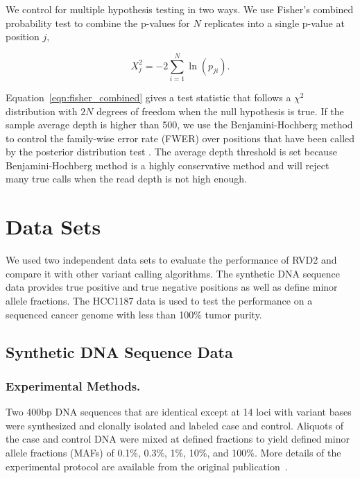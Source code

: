 \documentclass{bioinfo}
\begin{document}
We control for multiple hypothesis testing in two ways. We use Fisher's combined probability test \citep{fisher1970statistical} to combine the p-values for $N$ replicates into a single p-value at position $j$,

\begin{equation}\label{eqn:fisher_combined}
	X_j^2 = -2 \sum_{i=1}^N \ln(p_{ji}).
\end{equation}

Equation~\eqref{eqn:fisher_combined} gives a test statistic that follows a $\chi^2$ distribution with $2N$ degrees of freedom when the null hypothesis is true. If the sample average depth is higher than 500, we use the Benjamini-Hochberg method to control the family-wise error rate (FWER) over positions that have been called by the posterior distribution test \citep{benjamini1995controlling, efron2010large}. The average depth threshold is set because Benjamini-Hochberg method is a highly conservative method and will reject many true calls when the read depth is not high enough.

\section{Data Sets}

We used two independent data sets to evaluate the performance of RVD2 and compare it with other variant calling algorithms. The synthetic DNA sequence data provides true positive and true negative positions as well as define minor allele fractions. The HCC1187 data is used to test the performance on a sequenced cancer genome with less than 100\% tumor purity.

\subsection{Synthetic DNA Sequence Data}

\subsubsection*{Experimental Methods.}
Two 400bp DNA sequences that are identical except at 14 loci with variant bases were synthesized and clonally isolated and labeled case and control. Aliquots of the case and control DNA were mixed at defined fractions to yield defined minor allele fractions (MAFs) of 0.1\%, 0.3\%, 1\%, 10\%, and 100\%. More details of the experimental protocol are available from the original publication~\citep{Flaherty:2011ja}.
\end{document}
